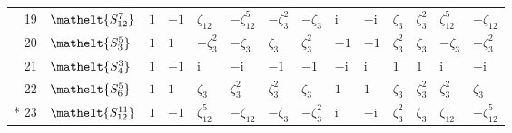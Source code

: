 \documentclass[10pt,a4paper]{article}
\numberwithin{equation}{section}
\newcommand{\eltfont}[1]{{\let\sigma\eltsigma\mathelt{#1}}}
\newcommand{\cls}[1]{\eltfont{#1}}
\newcommand{\iunit}{\mathrm{i}}
\newcommand{\rootunity}[1]{\zeta_{#1}}
\begin{document}
{\begin{longtable}{@{}rlllllllllllll@{}}
19 & $\cls{S_{12}^{7}}$ & $1$ & $-1$ & $\rootunity{12}$ & $-\rootunity{12}^{5}$ & $-\rootunity{3}^{2}$ & $-\rootunity{3}$ & $\iunit{}$ & $-\iunit{}$ & $\rootunity{3}$ & $\rootunity{3}^{2}$ & $\rootunity{12}^{5}$ & $-\rootunity{12}$\\
20 & $\cls{S_{3}^{5}}$ & $1$ & $1$ & $-\rootunity{3}^{2}$ & $-\rootunity{3}$ & $\rootunity{3}$ & $\rootunity{3}^{2}$ & $-1$ & $-1$ & $\rootunity{3}^{2}$ & $\rootunity{3}$ & $-\rootunity{3}$ & $-\rootunity{3}^{2}$\\
21 & $\cls{S_{4}^{3}}$ & $1$ & $-1$ & $\iunit{}$ & $-\iunit{}$ & $-1$ & $-1$ & $-\iunit{}$ & $\iunit{}$ & $1$ & $1$ & $\iunit{}$ & $-\iunit{}$\\
22 & $\cls{S_{6}^{5}}$ & $1$ & $1$ & $\rootunity{3}$ & $\rootunity{3}^{2}$ & $\rootunity{3}^{2}$ & $\rootunity{3}$ & $1$ & $1$ & $\rootunity{3}$ & $\rootunity{3}^{2}$ & $\rootunity{3}^{2}$ & $\rootunity{3}$\\*
23 & $\cls{S_{12}^{11}}$ & $1$ & $-1$ & $\rootunity{12}^{5}$ & $-\rootunity{12}$ & $-\rootunity{3}$ & $-\rootunity{3}^{2}$ & $\iunit{}$ & $-\iunit{}$ & $\rootunity{3}^{2}$ & $\rootunity{3}$ & $\rootunity{12}$ & $-\rootunity{12}^{5}$\\
\bottomrule\end{longtable}}
\end{document}
